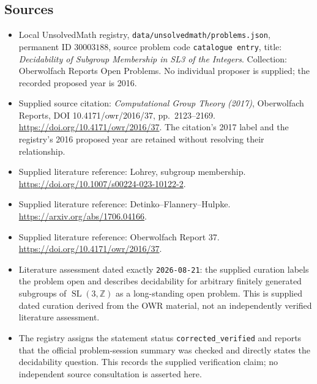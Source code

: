 \documentclass[11pt]{article}
\newcommand{\Z}{\mathbb{Z}}
\begin{document}
\subsection{Sources}
\begin{itemize}
\item Local UnsolvedMath registry, \texttt{data/unsolvedmath/problems.json}, permanent ID \(30003188\), source problem code \texttt{catalogue entry}, title: \emph{Decidability of Subgroup Membership in SL3 of the Integers}. Collection: Oberwolfach Reports Open Problems. No individual proposer is supplied; the recorded proposed year is 2016.
\item Supplied source citation: \emph{Computational Group Theory (2017)}, Oberwolfach Reports, DOI 10.4171/owr/2016/37, pp.\ 2123--2169. \url{https://doi.org/10.4171/owr/2016/37}. The citation's 2017 label and the registry's 2016 proposed year are retained without resolving their relationship.
\item Supplied literature reference: Lohrey, subgroup membership. \url{https://doi.org/10.1007/s00224-023-10122-2}.
\item Supplied literature reference: Detinko--Flannery--Hulpke. \url{https://arxiv.org/abs/1706.04166}.
\item Supplied literature reference: Oberwolfach Report 37. \url{https://doi.org/10.4171/owr/2016/37}.
\item Literature assessment dated exactly \texttt{2026-08-21}: the supplied curation labels the problem open and describes decidability for arbitrary finitely generated subgroups of \(\operatorname{SL}(3,\Z)\) as a long-standing open problem. This is supplied dated curation derived from the OWR material, not an independently verified literature assessment.
\item The registry assigns the statement status \texttt{corrected\_verified} and reports that the official problem-session summary was checked and directly states the decidability question. This records the supplied verification claim; no independent source consultation is asserted here.
\end{itemize}
\end{document}
